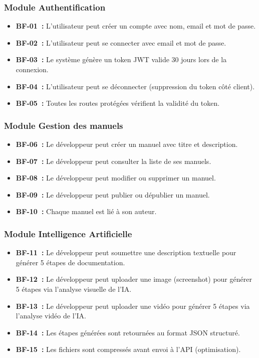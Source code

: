 \documentclass[12pt, a4paper, twoside, openany]{report}
\begin{document}
\subsubsection{Module Authentification}
\begin{itemize}
  \item \textbf{BF-01~:} L'utilisateur peut cr\'eer un compte avec nom, email et
        mot de passe.
  \item \textbf{BF-02~:} L'utilisateur peut se connecter avec email et mot de passe.
  \item \textbf{BF-03~:} Le syst\`eme g\'en\`ere un token JWT valide 30 jours lors
        de la connexion.
  \item \textbf{BF-04~:} L'utilisateur peut se d\'econnecter (suppression du token
        c\^ot\'e client).
  \item \textbf{BF-05~:} Toutes les routes prot\'eg\'ees v\'erifient la validit\'e
        du token.
\end{itemize}

\subsubsection{Module Gestion des manuels}
\begin{itemize}
  \item \textbf{BF-06~:} Le d\'eveloppeur peut cr\'eer un manuel avec titre et
        description.
  \item \textbf{BF-07~:} Le d\'eveloppeur peut consulter la liste de ses manuels.
  \item \textbf{BF-08~:} Le d\'eveloppeur peut modifier ou supprimer un manuel.
  \item \textbf{BF-09~:} Le d\'eveloppeur peut publier ou d\'epublier un manuel.
  \item \textbf{BF-10~:} Chaque manuel est li\'e \`a son auteur.
\end{itemize}

\subsubsection{Module Intelligence Artificielle}
\begin{itemize}
  \item \textbf{BF-11~:} Le d\'eveloppeur peut soumettre une description textuelle
        pour g\'en\'erer 5 \'etapes de documentation.
  \item \textbf{BF-12~:} Le d\'eveloppeur peut uploader une image (screenshot) pour
        g\'en\'erer 5 \'etapes via l'analyse visuelle de l'IA.
  \item \textbf{BF-13~:} Le d\'eveloppeur peut uploader une vid\'eo pour g\'en\'erer
        5 \'etapes via l'analyse vid\'eo de l'IA.
  \item \textbf{BF-14~:} Les \'etapes g\'en\'er\'ees sont retourn\'ees au format
        JSON structur\'e.
  \item \textbf{BF-15~:} Les fichiers sont compress\'es avant envoi \`a l'API
        (optimisation).
\end{itemize}
\end{document}
